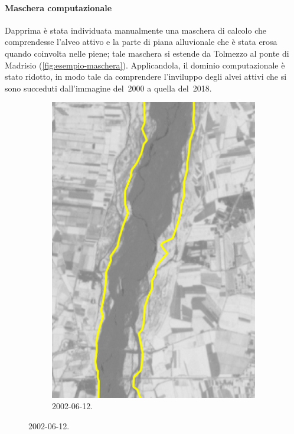 \paragraph{Maschera computazionale}
Dapprima è stata individuata manualmente una maschera di calcolo che comprendesse l'alveo attivo e la parte di piana alluvionale che è stata erosa quando coinvolta nelle piene; 
tale maschera si estende da Tolmezzo al ponte di Madrisio
(\cref{fig:esempio-maschera}). 
Applicandola, il dominio computazionale è stato ridotto, in modo tale da comprendere l'inviluppo degli alvei attivi che si sono succeduti dall'immagine del~2000 a quella del~2018.
%
\begin{figure}[t]
	\centering
	\begin{subfigure}[b]{0.4\textwidth}
		\includegraphics[width=\textwidth]{files/esempio_mask_2002_06_12.jpeg}
		\caption{\AST{} 2002-06-12.}

\end{subfigure}
\end{figure}
